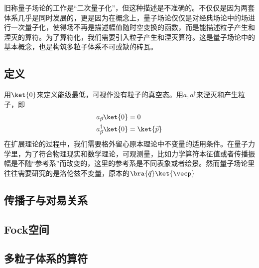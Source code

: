 \begin{issues}
\issueDraft
\end{issues}
旧称量子场论的工作是“二次量子化”，但这种描述是不准确的。不仅仅是因为两套体系几乎是同时发展的，更是因为在概念上，量子场论仅仅是对经典场论中的场进行一次量子化，使得场不再是描述幅值随时空变换的函数，而是能描述粒子产生和湮灭的算符。为了算符化，我们需要引入粒子产生和湮灭算符。这是量子场论中的基本概念，也是构筑多粒子体系不可或缺的砖瓦。


\subsection{定义}
用$\ket{0}$来定义能级最低，可视作没有粒子的真空态。用$ a, a^\dagger$来湮灭和产生粒子，即
\begin{equation}
\begin{aligned}
a_{\vec p}\ket{0}&=0\\
a^\dagger_{\vec p}\ket{0}&=\ket{\vec p}
\end{aligned}
\end{equation}
在扩展理论的过程中，我们需要格外留心原本理论中不变量的适用条件。在量子力学里，为了符合物理现实和数学理论，可观测量，比如力学算符本征值或者传播振幅是不随“参考系”而改变的，这里的参考系是不同表象或者绘景。然而量子场论里往往需要研究的是洛伦兹不变量，原本的$\bra{\vec q}\ket{\vecp}$
\subsection{传播子与对易关系}
\subsection{Fock空间}
\subsection{多粒子体系的算符}



